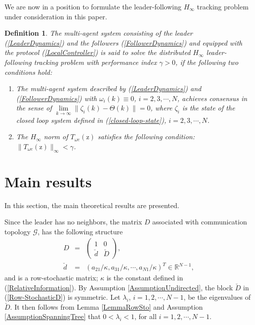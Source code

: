 \documentclass[a4paper,10pt,onecolumn]{article}
\newtheorem{definition}{Definition}
\begin{document}
We are now in a position to formulate the leader-following $H_\infty$ 
tracking problem under consideration in this paper. 

 \begin{definition}\label{Definition1}
The multi-agent system consisting of the leader (\ref{LeaderDynamics}) and the
followers (\ref{FollowerDynamics}) and equipped with the protocol
(\ref{LocalController}) is said to solve the distributed $H_{\infty}$
leader-following
tracking problem with  performance index $\gamma>0$, if the following two conditions hold:
\begin{enumerate}
  \item [i)] The multi-agent system described by (\ref{LeaderDynamics}) and
    (\ref{FollowerDynamics}) with $\omega_{i}(k)\equiv 0$,
    $i=2,3,\cdots,N$,  achieves consensus in the sense of
    $\lim\limits_{k\rightarrow \infty}\|\zeta_{i}(k)-\Theta(k)\|=0$, where
    $\zeta_{i}$ is the state of the closed loop system defined in
    (\ref{closed-loop-state}),
    $i=2,3,\cdots,N$.

  \item [ii)]The $H_{\infty}$ norm of $T_{\omega e}(\mathrm{z})$ satisfies the following condition:
  $\|T_{\omega e}(\mathrm{z})\|_{\infty}<\gamma$.
\end{enumerate}
\end{definition}

\section{Main results}
In this section, the main theoretical results are presented.

 Since the leader has no neighbors,
 the matrix $D$ associated with communication topology
 $\mathcal{G}$, has the following structure
 \begin{eqnarray}\label{Row-StochasticD}
D&=&\left(\begin{array}{cc}
1&0\\
\breve{d}& \breve{D}
\end{array}\right), \\
\breve{d}&=&
(a_{21}/\kappa,a_{31}/\kappa,\cdots,a_{N1}/\kappa)^{T}\in
\mathbb{R}^{N-1}, \nonumber
\end{eqnarray}
and is a row-stochastic matrix; $\kappa$ is the constant defined in
(\ref{RelativeInformation}).
By Assumption \ref{AssumptionUndirected}, the
block $\breve{D}$ in (\ref{Row-StochasticD}) is symmetric. Let $\lambda_{i}$, $i=1,2,\cdots,N-1$, be the eigenvalues of $\breve{D}$.
It then follows from Lemma \ref{LemmaRowSto} and Assumption \ref{AssumptionSpanningTree} that
 $0<\lambda_{i}<1$, for all $i=1,2,\cdots,N-1$.
\end{document}
